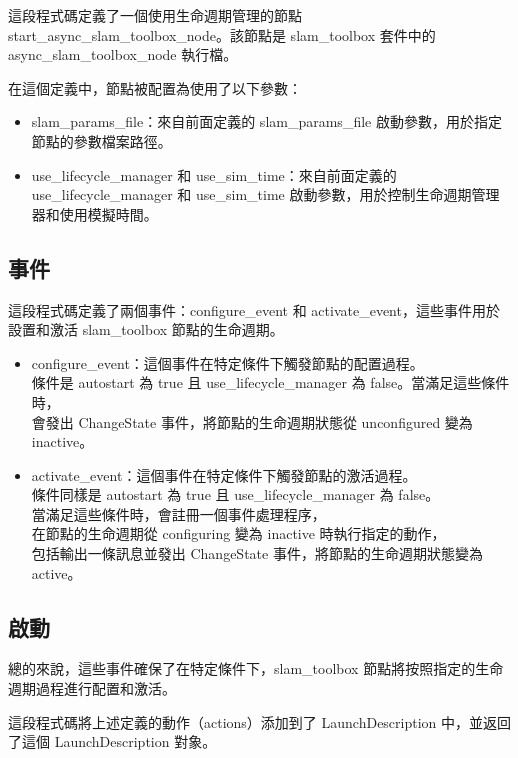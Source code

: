 這段程式碼定義了一個使用生命週期管理的節點 start\_async\_slam\_toolbox\_node。該節點是 slam\_toolbox 套件中的 async\_slam\_toolbox\_node 執行檔。

在這個定義中，節點被配置為使用了以下參數：
\begin{itemize}
    \item slam\_params\_file：來自前面定義的 slam\_params\_file 啟動參數，用於指定節點的參數檔案路徑。
    \item use\_lifecycle\_manager 和 use\_sim\_time：來自前面定義的 use\_lifecycle\_manager 和 use\_sim\_time 啟動參數，用於控制生命週期管理器和使用模擬時間。
\end{itemize}
\subsection{事件}
這段程式碼定義了兩個事件：configure\_event 和 activate\_event，這些事件用於設置和激活 slam\_toolbox 節點的生命週期。

\begin{itemize}
    \item configure\_event：這個事件在特定條件下觸發節點的配置過程。\\
        條件是 autostart 為 true 且 use\_lifecycle\_manager 為 false。當滿足這些條件時，\\
        會發出 ChangeState 事件，將節點的生命週期狀態從 unconfigured 變為 inactive。
    \item activate\_event：這個事件在特定條件下觸發節點的激活過程。\\
        條件同樣是 autostart 為 true 且 use\_lifecycle\_manager 為 false。\\
        當滿足這些條件時，會註冊一個事件處理程序，\\
        在節點的生命週期從 configuring 變為 inactive 時執行指定的動作，\\
        包括輸出一條訊息並發出 ChangeState 事件，將節點的生命週期狀態變為 active。
\end{itemize}

\subsection{啟動}
總的來說，這些事件確保了在特定條件下，slam\_toolbox 節點將按照指定的生命週期過程進行配置和激活。


這段程式碼將上述定義的動作（actions）添加到了 LaunchDescription 中，並返回了這個 LaunchDescription 對象。

